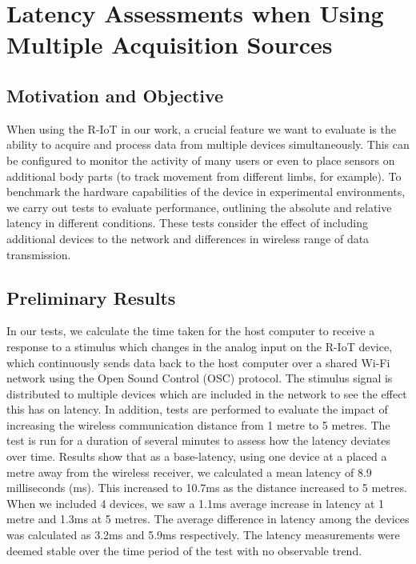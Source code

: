 \section{Latency Assessments when Using Multiple Acquisition Sources}

\subsection*{Motivation and Objective}


When using the R-IoT in our work, a crucial feature we want to evaluate is the ability to acquire and process data from multiple devices simultaneously. This can be configured to monitor the activity of many users or even to place sensors on additional body parts (to track movement from different limbs, for example). To benchmark the hardware capabilities of the device in experimental environments, we carry out tests to evaluate performance, outlining the absolute and relative latency in different conditions. These tests consider the effect of including additional devices to the network and differences in wireless range of data transmission.

\subsection*{Preliminary Results}

In our tests, we calculate the time taken for the host computer to receive a response to a stimulus which changes in the analog input on the R-IoT device, which continuously sends data back to the host computer over a shared Wi-Fi network using the Open Sound Control (OSC) protocol. The stimulus signal is distributed to multiple devices which are included in the network to see the effect this has on latency. In addition, tests are performed to evaluate the impact of increasing the wireless communication distance from 1 metre to 5 metres. The test is run for a duration of several minutes to assess how the latency deviates over time.
Results show that as a base-latency, using one device at a placed a metre away from the wireless receiver, we calculated a mean latency of 8.9 milliseconds (ms). This increased to 10.7ms as the distance increased to 5 metres. When we included 4 devices, we saw a 1.1ms average increase in latency at 1 metre and 1.3ms at 5 metres. The average difference in latency among the devices was calculated as 3.2ms and 5.9ms respectively. The latency measurements were deemed stable over the time period of the test with no observable trend.

